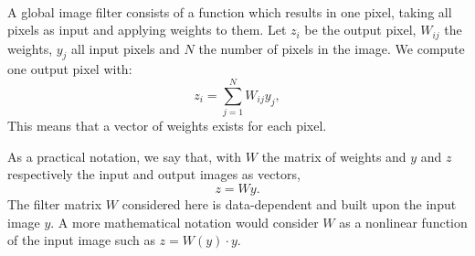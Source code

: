 \paragraph{}
A global image filter consists of a function which results in one pixel, taking all pixels as input and applying weights to them.
\ifthesis
 Let \(z_i\) be the output pixel, \(W_{ij}\) the weights, \(y_j\) all input pixels and \(N\) the number of pixels in the image.
 We compute one output pixel with:
 \[z_i = \sum^{N}_{j=1} W_{ij}y_j,\]
 This means that a vector of weights exists for each pixel.
\fi

As a practical notation, we say that, with \(W\) the matrix of weights and \(y\) and \(z\) respectively the input and output images as vectors,
\[z = Wy.\]
The filter matrix \(W\) considered here is data-dependent and built upon the input image \(y\).
A more mathematical notation would consider \(W\) as a nonlinear function of the input image such as \(z = W(y) \cdot y\).
